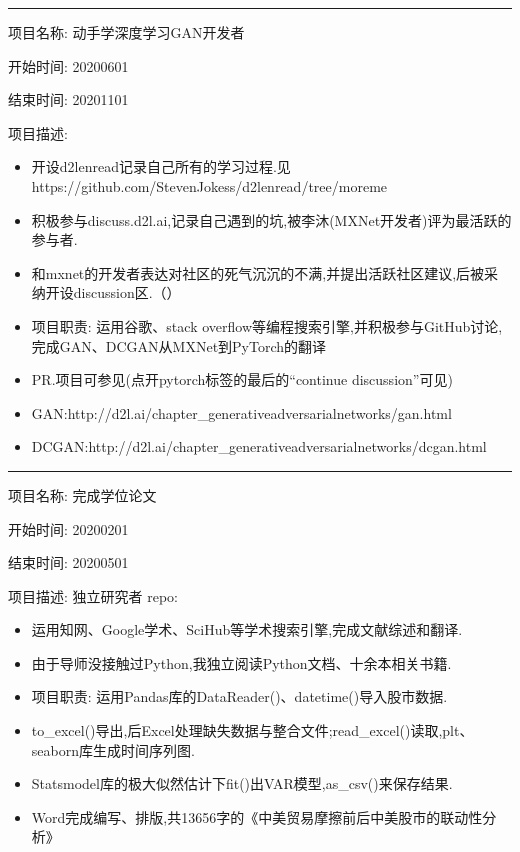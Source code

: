 \documentclass[letterpaper,10pt,english]{sphinxmanual}
\begin{document}
\bigskip\hrule\bigskip


项目名称: 动手学深度学习GAN开发者

开始时间: 2020\sphinxhyphen{}06\sphinxhyphen{}01

结束时间: 2020\sphinxhyphen{}11\sphinxhyphen{}01

项目描述:
\begin{itemize}
\item {} 
开设d2l\sphinxhyphen{}en\sphinxhyphen{}read记录自己所有的学习过程.见https://github.com/StevenJokess/d2l\sphinxhyphen{}en\sphinxhyphen{}read/tree/moreme

\item {} 
积极参与discuss.d2l.ai,记录自己遇到的坑,被李沐(MXNet开发者)评为最活跃的参与者.

\item {} 
和mxnet的开发者表达对社区的死气沉沉的不满,并提出活跃社区建议,后被采纳开设discussion区.（）

\item {} 
项目职责: 运用谷歌、stack
overflow等编程搜索引擎,并积极参与GitHub讨论,完成GAN、DCGAN从MXNet到PyTorch的翻译

\item {} 
PR.项目可参见(点开pytorch标签的最后的“continue discussion”可见)

\item {} 
GAN:http://d2l.ai/chapter\_generative\sphinxhyphen{}adversarial\sphinxhyphen{}networks/gan.html

\item {} 
DCGAN:http://d2l.ai/chapter\_generative\sphinxhyphen{}adversarial\sphinxhyphen{}networks/dcgan.html

\end{itemize}


\bigskip\hrule\bigskip


项目名称: 完成学位论文

开始时间: 2020\sphinxhyphen{}02\sphinxhyphen{}01

结束时间: 2020\sphinxhyphen{}05\sphinxhyphen{}01

项目描述: 独立研究者 repo: 
\begin{itemize}
\item {} 
运用知网、Google学术、SciHub等学术搜索引擎,完成文献综述和翻译.

\item {} 
由于导师没接触过Python,我独立阅读Python文档、十余本相关书籍.

\item {} 
项目职责: 运用Pandas库的DataReader()、datetime()导入股市数据.

\item {} 
to\_excel()导出,后Excel处理缺失数据与整合文件;read\_excel()读取,plt、seaborn库生成时间序列图.

\item {} 
Statsmodel库的极大似然估计下fit()出VAR模型,as\_csv()来保存结果.

\item {} 
Word完成编写、排版,共13656字的《中美贸易摩擦前后中美股市的联动性分析》

\end{itemize}
\end{document}
